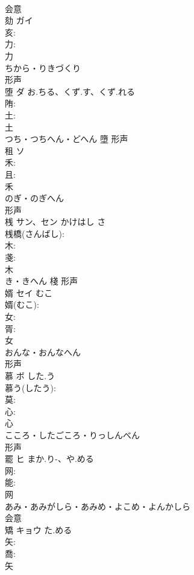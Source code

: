 \documentclass[8pt]{extreport}
\begin{document}
\begin{CJK}{UTF8}{min}
\\	会意 
\\	劾	ガイ			
\\	亥: 
\\	力: 
\\	力	
\\	ちから・りきづくり	
\\	形声 
\\	堕	ダ	お.ちる、くず.す、くず.れる		
\\	陏: 
\\	土: 
\\	土	
\\	つち・つちへん・どへん	墮	形声 
\\	租	ソ			
\\	禾: 
\\	且: 
\\	禾	
\\	のぎ・のぎへん	
\\	形声 
\\	桟	サン、セン	かけはし	さ	
\\	桟橋(さんばし): 
\\	木: 
\\	戔: 
\\	木	
\\	き・きへん	棧	形声 
\\	婿	セイ	むこ		
\\	婿(むこ): 
\\	女: 
\\	胥: 
\\	女	
\\	おんな・おんなへん	
\\	形声 
\\	慕	ボ	した.う		
\\	慕う(したう): 
\\	莫: 
\\	心: 
\\	心	
\\	こころ・したごころ・りっしんべん	
\\	形声 
\\	罷	ヒ	まか.り-、や.める		
\\	网: 
\\	能: 
\\	网	
\\	あみ・あみがしら・あみめ・よこめ・よんかしら	
\\	会意 
\\	矯	キョウ	た.める		
\\	矢: 
\\	喬: 
\\	矢	

\end{CJK}
\end{document}
